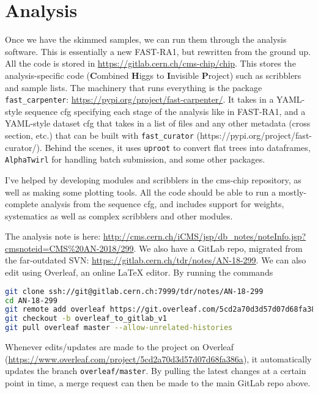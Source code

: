 \section{Analysis}

Once we have the skimmed samples, we can run them through the analysis software. This is essentially a new FAST-RA1, but rewritten from the ground up. All the code is stored in \url{https://gitlab.cern.ch/cms-chip/chip}. This stores the analysis-specific code (\textbf{C}ombined \textbf{H}iggs to \textbf{I}nvisible \textbf{P}roject) such as scribblers and sample lists. The machinery that runs everything is the package \texttt{fast\_carpenter}: \url{https://pypi.org/project/fast-carpenter/}. It takes in a YAML-style sequence cfg specifying each stage of the analysis like in FAST-RA1, and a YAML-style dataset cfg that takes in a list of files and any other metadata (cross section, etc.) that can be built with \texttt{fast\_curator} (https://pypi.org/project/fast-curator/). Behind the scenes, it uses \texttt{uproot} to convert flat trees into dataframes, \texttt{AlphaTwirl} for handling batch submission, and some other packages.

I've helped by developing modules and scribblers in the cms-chip repository, as well as making some plotting tools. All the code should be able to run a mostly-complete analysis from the sequence cfg, and includes support for weights, systematics as well as complex scribblers and other modules.

The analysis note is here: \url{http://cms.cern.ch/iCMS/jsp/db_notes/noteInfo.jsp?cmsnoteid=CMS%20AN-2018/299}. We also have a GitLab repo, migrated from the far-outdated SVN: \url{https://gitlab.cern.ch/tdr/notes/AN-18-299}. We can also edit using Overleaf, an online LaTeX editor. By running the commands

\begin{lstlisting}[belowskip=-0.7cm, language=sh, numbers=none]
git clone ssh://git@gitlab.cern.ch:7999/tdr/notes/AN-18-299
cd AN-18-299
git remote add overleaf https://git.overleaf.com/5cd2a70d3d57d07d68fa386a
git checkout -b overleaf_to_gitlab_v1
git pull overleaf master --allow-unrelated-histories
\end{lstlisting}

Whenever edits/updates are made to the project on Overleaf (\url{https://www.overleaf.com/project/5cd2a70d3d57d07d68fa386a}), it automatically updates the branch \texttt{overleaf/master}. By pulling the latest changes at a certain point in time, a merge request can then be made to the main GitLab repo above.

